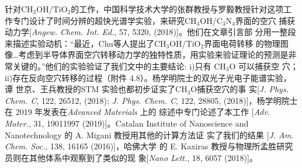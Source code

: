 \begin{justify}
  \small\kaishu\color{magenta}{}
  针对CH$_{3}$OH/TiO$_{2}$的工作，中国科学技术大学的张群教授与罗毅教授针对这项工
  作专门设计了时间分辨的超快光谱学实验，来研究CH$_{3}$OH/C$_{3}$N$_{4}$界面的空穴
  捕获动力学[\textit{Angew. Chem. Int. Ed.}, 57, 5320, (2018)]。他们在文章引言部
  分用一整段来描述实验动机：“最近，Chu等人提出了CH$_{3}$OH/TiO$_{2}$界面电荷转移
  的物理图像…考虑到半导体界面空穴转移动力学的独特性质，用实验来验证理论的预测是非
  常关键的。”他们的实验验证了我们文中的主要结论: i)只有 CH$_{3}$O 可以捕获空
  穴；ii)存在反向空穴转移的过程（附件 4.8）。杨学明院士的双光子光电子能谱实验，谭
  世京、王兵教授的STM 实验也都初步证实了CH$_3$O捕获空穴的事
  实[\textit{J. Phys. Chem. C}, 122, 26512, (2018); \textit{J. Phys. Chem. C},
  122, 28805, (2018)]，杨学明院士在 2019 年发表在\textit{Advanced Materials} 上的
  综述中专门论述了本工作 [\textit{Adv. Mater.}, 31, 19011997 (2019)]。Catalan
  Institute of Nanoscience and Nanotechnology 的 A. Migani 教授用其他的计算方法证
  实了我们的结果 [\textit{J. Am. Chem. Soc.}, 138, 16165 (2016)]，哈佛大学
  的 E. Kaxiras 教授与物理所孟胜研究员则在其他体系中观察到了类似的现
  象[\textit{Nano Lett.}, 18, 6057 (2018)]。
\end{justify}
